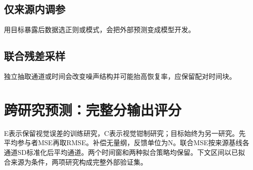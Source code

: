 \documentclass[11pt,a4paper]{article}
\begin{document}
\subsection*{仅来源内调参}
用目标暴露后数据选正则或模式，会把外部预测变成模型开发。

\subsection*{联合残差采样}
独立抽取通道或时间会改变噪声结构并可能抬高恢复率，应保留配对时间块。

\clearpage\section{跨研究预测：完整分输出评分}
E表示保留视觉误差的训练研究，C表示视觉钳制研究；目标始终为另一研究。先平均参与者MSE再取RMSE。补偿无量纲，反馈单位为N。联合MSE按来源基线各通道SD标准化后平均通道。两个时间窗和两种拟合策略均保留。下文区间以已拟合来源为条件，两项研究构成完整外部验证集。
\end{document}
